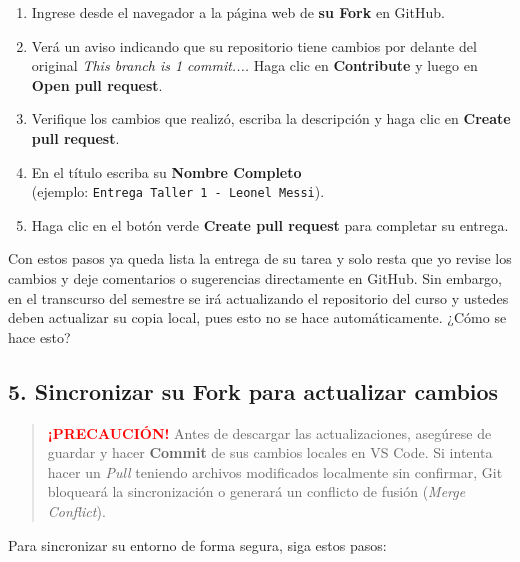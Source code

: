 \documentclass[12pt]{article}
\begin{document}
\begin{enumerate}[label=\arabic*)]
    \item Ingrese desde el navegador a la página web de \textbf{su Fork} en GitHub.
    \item Verá un aviso indicando que su repositorio tiene cambios por delante del original
    \textit{This branch is 1 commit....} 
    Haga clic en \textbf{Contribute} y luego en \textbf{Open pull request}.
    \item Verifique los cambios que realizó, escriba la descripción y haga clic 
    en \textbf{Create pull request}.
    \item En el título escriba su \textbf{Nombre Completo} \\
    (ejemplo: \texttt{Entrega Taller 1 - Leonel Messi}).
    \item Haga clic en el botón verde \textbf{Create pull request} para completar su entrega.
\end{enumerate}
Con estos pasos ya queda lista la entrega de su tarea y solo resta que yo revise los cambios 
y deje comentarios o sugerencias directamente en GitHub. Sin embargo, 
en el transcurso del semestre se irá actualizando el repositorio del curso
y ustedes deben actualizar su copia local, pues esto no se hace automáticamente. 
¿Cómo se hace esto? 

\subsection*{5. Sincronizar su Fork para actualizar cambios}

\begin{quote}
\textbf{\textcolor{red}{¡PRECAUCIÓN!}} Antes de descargar las actualizaciones, 
asegúrese de guardar y hacer \textbf{Commit} de sus cambios locales en VS Code. 
Si intenta hacer un \emph{Pull} teniendo archivos modificados localmente sin confirmar, 
Git bloqueará la sincronización o generará un conflicto de fusión (\emph{Merge Conflict}).
\end{quote}

Para sincronizar su entorno de forma segura, siga estos pasos:
\end{document}
